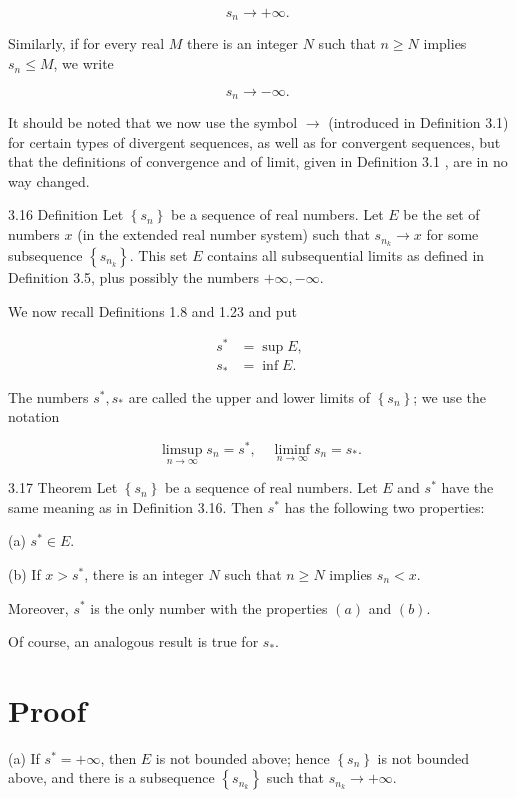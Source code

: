 \documentclass[10pt]{article}
\begin{document}
$$
s_{n} \rightarrow+\infty \text {. }
$$

Similarly, if for every real $M$ there is an integer $N$ such that $n \geq N$ implies $s_{n} \leq M$, we write

$$
s_{n} \rightarrow-\infty \text {. }
$$

It should be noted that we now use the symbol $\rightarrow$ (introduced in Definition 3.1) for certain types of divergent sequences, as well as for convergent sequences, but that the definitions of convergence and of limit, given in Definition 3.1 , are in no way changed.

3.16 Definition Let $\left\{s_{n}\right\}$ be a sequence of real numbers. Let $E$ be the set of numbers $x$ (in the extended real number system) such that $s_{n_{k}} \rightarrow x$ for some subsequence $\left\{s_{n_{k}}\right\}$. This set $E$ contains all subsequential limits as defined in Definition 3.5, plus possibly the numbers $+\infty,-\infty$.

We now recall Definitions 1.8 and 1.23 and put

$$
\begin{aligned}
s^{*} & =\sup E, \\
s_{*} & =\inf E .
\end{aligned}
$$

The numbers $s^{*}, s_{*}$ are called the upper and lower limits of $\left\{s_{n}\right\}$; we use the notation

$$
\limsup _{n \rightarrow \infty} s_{n}=s^{*}, \quad \liminf _{n \rightarrow \infty} s_{n}=s_{*} .
$$

3.17 Theorem Let $\left\{s_{n}\right\}$ be a sequence of real numbers. Let $E$ and $s^{*}$ have the same meaning as in Definition 3.16. Then $s^{*}$ has the following two properties:

(a) $s^{*} \in E$.

(b) If $x>s^{*}$, there is an integer $N$ such that $n \geq N$ implies $s_{n}<x$.

Moreover, $s^{*}$ is the only number with the properties $(a)$ and $(b)$.

Of course, an analogous result is true for $s_{*}$.

\section{Proof}
(a) If $s^{*}=+\infty$, then $E$ is not bounded above; hence $\left\{s_{n}\right\}$ is not bounded above, and there is a subsequence $\left\{s_{n_{k}}\right\}$ such that $s_{n_{k}} \rightarrow+\infty$.
\end{document}
